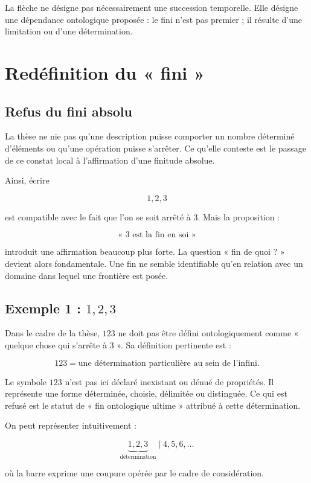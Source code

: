 \documentclass[11pt,a4paper]{article}
\begin{document}
La flèche ne désigne pas nécessairement une succession temporelle. Elle désigne une dépendance ontologique proposée : le fini n'est pas premier ; il résulte d'une limitation ou d'une détermination.

\section{Redéfinition du « fini »}

\subsection{Refus du fini absolu}

La thèse ne nie pas qu'une description puisse comporter un nombre déterminé d'éléments ou qu'une opération puisse s'arrêter. Ce qu'elle conteste est le passage de ce constat local à l'affirmation d'une finitude absolue.

Ainsi, écrire

\[
1,2,3
\]

est compatible avec le fait que l'on se soit arrêté à \(3\). Mais la proposition :

\[
\text{« 3 est la fin en soi »}
\]

introduit une affirmation beaucoup plus forte. La question « fin de quoi ? » devient alors fondamentale. Une fin ne semble identifiable qu'en relation avec un domaine dans lequel une frontière est posée.

\subsection{Exemple 1 : \(1,2,3\)}

Dans le cadre de la thèse, \(123\) ne doit pas être défini ontologiquement comme « quelque chose qui s'arrête à 3 ». Sa définition pertinente est :

\[
\boxed{123 = \text{une détermination particulière au sein de l'infini}.}
\]

Le symbole \(123\) n'est pas ici déclaré inexistant ou dénué de propriétés. Il représente une forme déterminée, choisie, délimitée ou distinguée. Ce qui est refusé est le statut de « fin ontologique ultime » attribué à cette détermination.

On peut représenter intuitivement :

\[
\underbrace{1,2,3}_{\text{détermination}}
\;\big|
\;4,5,6,\ldots
\]

où la barre exprime une coupure opérée par le cadre de considération.
\end{document}
